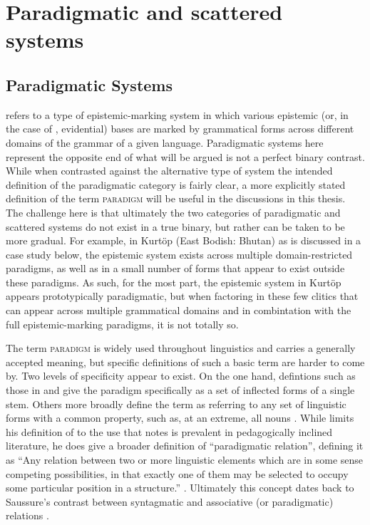 \section{Paradigmatic and scattered systems}
\subsection{Paradigmatic Systems}\label{sss:Discussion:Paradigmatic}
 refers to a type of epistemic-marking system in which various epistemic (or, in the case of , evidential) bases are marked by grammatical forms across different domains of the grammar of a given language. Paradigmatic systems here represent the opposite end of what will be argued is not a perfect binary contrast. While when contrasted against the alternative type of system the intended definition of the paradigmatic category is fairly clear, a more explicitly stated definition of the term \textsc{paradigm} will be useful in the discussions in this thesis. The challenge here is that ultimately the two categories of paradigmatic and scattered systems do not exist in a true binary, but rather can be taken to be more gradual. For example, in Kurtöp (East Bodish: Bhutan) as is discussed in a case study below, the epistemic system exists across multiple domain-restricted paradigms, as well as in a small number of forms that appear to exist outside these paradigms. As such, for the most part, the epistemic system in Kurtöp appears prototypically paradigmatic, but when factoring in these few clitics that can appear across multiple grammatical domains and in combintation with the full epistemic-marking paradigms, it is not totally so.

The term \textsc{paradigm} is widely used throughout linguistics and carries a generally accepted meaning, but specific definitions of such a basic term are harder to come by. Two levels of specificity appear to exist. On the one hand, defintions such as those in  and  give the paradigm specifically as a set of inflected forms of a single stem. Others more broadly define the term as referring to any set of linguistic forms with a common property, such as, at an extreme, all nouns \cite{Booij2007}. While  limits his definition of to the use that  notes is prevalent in pedagogically inclined literature, he does give a broader definition of ``paradigmatic relation'', defining it as ``Any relation between two or more linguistic elements which are in some sense competing possibilities, in that exactly one of them may be selected to occupy some particular position in a structure.'' \cite[197]{Trask1993}. Ultimately this concept dates back to Saussure's contrast between syntagmatic and associative (or paradigmatic) relations \cite{Saussure2013}.

